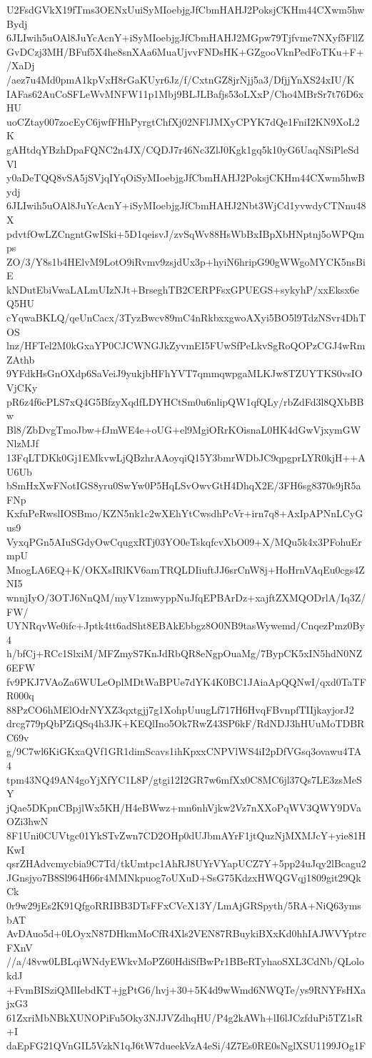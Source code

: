 U2FsdGVkX19fTms3OENxUuiSyMIoebjgJfCbmHAHJ2PoksjCKHm44CXwm5hwBydj
6JLIwih5uOAl8JuYcAcnY+iSyMIoebjgJfCbmHAHJ2MGpw79Tjfvme7NXyf5FllZ
GvDCzj3MH/BFuf5X4he8snXAa6MuaUjvvFNDsHK+GZgooVknPedFoTKu+F+/XaDj
/aez7u4Md0pmA1kpVxH8rGaKUyr6Jz/f/CxtnGZ8jrNjj5a3/DfjjYnXS24xIU/K
IAFas62AuCoSFLeWvMNFW11p1Mbj9BLJLBafjs53oLXxP/Cho4MBrSr7t76D6xHU
uoCZtay007zocEyC6jwfFHhPyrgtChfXj02NFlJMXyCPYK7dQe1FniI2KN9XoL2K
gAHtdqYBzhDpaFQNC2n4JX/CQDJ7r46Nc3ZlJ0Kgk1gq5k10yG6UaqNSiPleSdVl
y0aDeTQQ8vSA5jSVjqIYqOiSyMIoebjgJfCbmHAHJ2PoksjCKHm44CXwm5hwBydj
6JLIwih5uOAl8JuYcAcnY+iSyMIoebjgJfCbmHAHJ2Nbt3WjCd1yvwdyCTNnu48X
pdvtfOwLZCngntGwISki+5D1qeisvJ/zvSqWv88HsWbBxIBpXbHNptnj5oWPQmps
ZO/3/Y8s1b4HElvM9LotO9iRvmv9zsjdUx3p+hyiN6hripG90gWWgoMYCK5nsBiE
kNDutEbiVwaLALmUIzNJt+BrseghTB2CERPFsxGPUEGS+sykyhP/xxEksx6eQ5HU
cYqwaBKLQ/qeUnCacx/3TyzBwcv89mC4nRkbxxgwoAXyi5BO5l9TdzNSvr4DhTOS
lnz/HFTel2M0kGxaYP0CJCWNGJkZyvmEI5FUwSfPeLkvSgRoQOPzCGJ4wRmZAthb
9YFdkHsGnOXdp6SaVeiJ9yukjbHFhYVT7qmmqwpgaMLKJw8TZUYTKS0vsIOVjCKy
pR6z4f6cPLS7xQ4G5BfzyXqdfLDYHCtSm0u6nlipQW1qfQLy/rbZdFd3l8QXbBBw
Bl8/ZbDvgTmoJbw+fJmWE4e+oUG+el9MgiORrKOisnaL0HK4dGwVjxymGWNlzMJf
13FqLTDKk0Gj1EMkvwLjQBzhrAAoyqiQ15Y3bmrWDbJC9qpgprLYR0kjH++AU6Ub
bSmHxXwFNotIGS8yru0SwYw0P5HqLSvOwvGtH4DhqX2E/3FH6sg8370s9jR5aFNp
KxfuPeRwslIOSBmo/KZN5nk1c2wXEhYtCwsdhPcVr+irn7q8+AxIpAPNnLCyGus9
VyxqPGn5AIuSGdyOwCqugxRTj03YO0eTskqfcvXbO09+X/MQu5k4x3PFohuErmpU
MnogLA6EQ+K/OKXsIRlKV6amTRQLDIiuftJJ6srCnW8j+HoHrnVAqEu0cgs4ZNI5
wnnjIyO/3OTJ6NnQM/myV1zmwyppNuJfqEPBArDz+xajftZXMQODrlA/Iq3Z/FW/
UYNRqvWe0ifc+Jptk4tt6adSht8EBAkEbbgz8O0NB9tasWywemd/CnqezPmz0By4
h/bfCj+RCc1SlxiM/MFZmyS7KnJdRbQR8eNgpOuaMg/7BypCK5xIN5hdN0NZ6EFW
fv9PKJ7VAoZa6WULeOplMDtWaBPUe7dYK4K0BC1JAiaApQQNwI/qxd0TaTFR000q
88PzCO6hMElOdrNYXZ3qxtgjj7g1XohpUuugLf717H6HvqFBvnpfTIIjkayjorJ2
drcg779pQbPZiQSq4h3JK+KEQlIno5Ok7RwZ43SP6kF/RdNDJ3hHUuMoTDBRC69v
g/9C7wl6KiGKxaQVf1GR1dimScavs1ihKpxxCNPVlWS4iI2pDfVGsq3ovawu4TA4
tpm43NQ49AN4goYjXfYC1L8P/gtgi12I2GR7w6mfXx0C8MC6jl37Qs7LE3zsMeSY
jQae5DKpnCBpjlWx5KH/H4eBWwz+mn6nhVjkw2Vz7nXXoPqWV3QWY9DVaOZi3hwN
8F1Uni0CUVtgc01YkSTvZwn7CD2OHp0dUJbmAYrF1jtQuzNjMXMJcY+yie81HKwI
qsrZHAdvcmycbia9C7Td/tkUmtpc1AhRJ8UYrVYapUCZ7Y+5pp24uJqy2lBcagu2
JGnsjyo7B8Sl964H66r4MMNkpuog7oUXuD+SsG75KdzxHWQGVqj1809git29QkCk
0r9w29jEs2K91QfgoRRIBB3DTsFFxCVcX13Y/LmAjGRSpyth/5RA+NiQ63ymsbAT
AvDAuo5d+0LOyxN87DHkmMoCfR4Xls2VEN87RBuykiBXxKd0hhIAJWVYptrcFXnV
//a/48vw0LBLqiWNdyEWkvMoPZ60HdiSfBwPr1BBeRTyhaoSXL3CdNb/QLolokdJ
+FvmBISziQMlIebdKT+jgPtG6/hvj+30+5K4d9wWmd6NWQTe/ys9RNYFsHXajxG3
61ZxriMbNBkXUNOPiFu5Oky3NJJVZdhqHU/P4g2kAWh+lI6lJCzfduPi5TZ1sR+I
daEpFG21QVnGIL5VzkN1qJ6tW7dueekVzA4eSi/4Z7Es0RE0sNglXSU1199JOg1F
